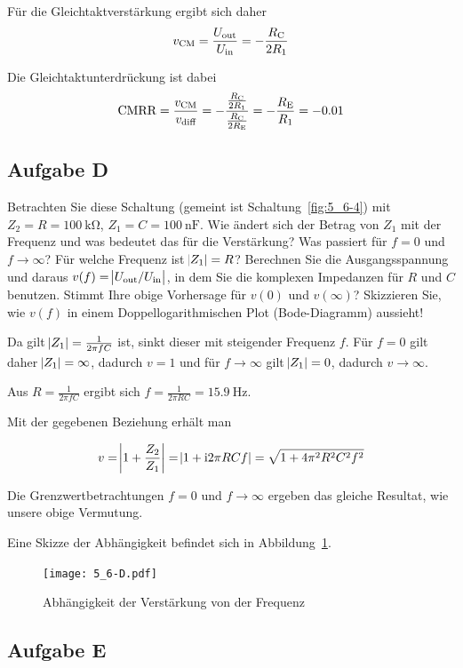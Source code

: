 Für die Gleichtaktverstärkung ergibt sich daher 
\[
    v_\text{CM} = \frac{U_\text{out}}{U_\text{in}} = -\frac {R_\text{C}} {2R_1}
\]

Die Gleichtaktunterdrückung ist dabei
\[
    \text{CMRR} = \frac {v_\text{CM}}{v_\text{diff}} = -\frac
    {\frac{R_\text{C}}{2R_1}}{\frac{R_\text{C}}{2R_\text{E}}} = -\frac{R_\text{E}}{R_1} = -0.01
\]

\FloatBarrier
\subsection{Aufgabe D}

\begin{problem}
    Betrachten Sie diese Schaltung (gemeint ist Schaltung~\ref{fig:5_6-4}) mit
    $Z_2 = R = \SI {100}{\kilo\ohm}$, $Z_1 = C = \SI {100}{\nano\farad}$. Wie
    ändert sich der Betrag von $Z_1$ mit der Frequenz und was bedeutet das für
    die Verstärkung? Was passiert für $f = 0$ und $f \to \infty$? Für welche
    Frequenz ist $\abs{Z_1} = R$? Berechnen Sie die Ausgangsspannung und
    daraus $v(f) = \abs{U_\text{out} / U_\text{in}}$, in dem Sie die komplexen Impedanzen für
    $R$ und $C$ benutzen. Stimmt Ihre obige Vorhersage für $v(0)$ und
    $v(\infty)$? Skizzieren Sie, wie $v(f)$ in einem Doppellogarithmischen Plot
    (Bode-Diagramm) aussieht!
\end{problem}

Da gilt $\abs{Z_1}=\frac 1{2\pi fC}$ ist, sinkt dieser mit steigender Frequenz
$f$. Für $f = 0$ gilt daher $\abs{Z_1} = \infty$, dadurch $v = 1$ und für $f
\to \infty$ gilt $\abs{Z_1} = 0$, dadurch $v \to \infty$.

Aus $R = \frac 1{2\pi fC}$ ergibt sich $f = \frac 1{2\pi RC} =
\SI{15.9}{\hertz}$.

Mit der gegebenen Beziehung erhält man

\[
    v = \abs{1 + \frac {Z_2}{Z_1}} = \abs{1 + \mathrm i 2\pi RC f} = \sqrt{1 +
    4\pi^2R^2C^2 f^2} 
\]

Die Grenzwertbetrachtungen $f = 0$ und $f \to \infty$ ergeben das gleiche
Resultat, wie unsere obige Vermutung.

Eine Skizze der Abhängigkeit befindet sich in Abbildung~\ref{fig:5_6-D}.

\begin{figure}[htbp]
    \centering
    \texttt{[image: 5\_6-D.pdf]}
    \caption{%
        Abhängigkeit der Verstärkung von der Frequenz
    }
    \label{fig:5_6-D}
\end{figure}

\FloatBarrier
\subsection{Aufgabe E}

